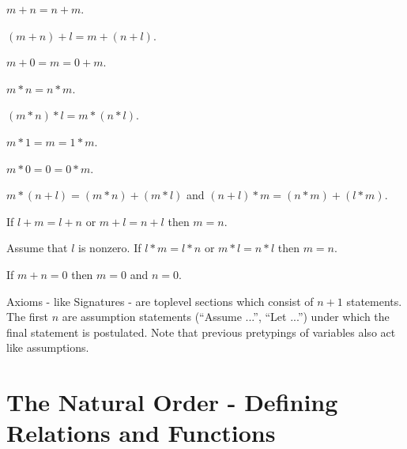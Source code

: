 \documentclass[11pt]{article}
\begin{document}
\begin{forthel}
\begin{axiom} $m + n = n + m$.
\end{axiom}

\begin{axiom} $(m + n) + l = m + (n + l)$.
\end{axiom}

\begin{axiom}  $m + 0 = m = 0 + m$.
\end{axiom}

\begin{axiom} $m * n = n * m$.
\end{axiom}

\begin{axiom} $(m * n) * l = m * (n * l)$.
\end{axiom}

\begin{axiom} $m * 1 = m = 1 * m$.
\end{axiom}

\begin{axiom} $m * 0 = 0 = 0 * m$.
\end{axiom}

\begin{axiom} $m * (n + l) = (m * n) + (m * l)$ and
                $(n + l) * m = (n * m) + (l * m)$.
\end{axiom}

\begin{axiom} If $l + m = l + n$ or $m + l = n + l$
then $m = n$.
\end{axiom}

\begin{axiom} Assume that $l$ is nonzero.
If $l * m = l * n$ or $m * l = n * l$ then $m = n$.
\end{axiom}

\begin{axiom} If $m + n = 0$ then $m = 0$ and $n = 0$.
\end{axiom}

\end{forthel}

Axioms - like Signatures - are toplevel sections which consist of
$n + 1$ statements. The first $n$ are assumption statements
(``Assume ...'', ``Let ...'')
under which the final statement is postulated. Note that previous
pretypings of variables also act like assumptions.

\section{The Natural Order - Defining \\Relations and Functions}
\end{document}
